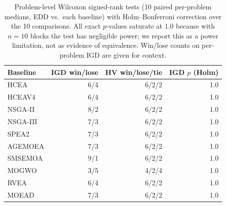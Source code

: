 \begin{table}[t]
\centering
\caption{Problem-level Wilcoxon signed-rank tests (10 paired per-problem
medians, EDD vs.\ each baseline) with Holm--Bonferroni correction over the
10 comparisons. All exact $p$-values saturate at $1.0$ because with $n=10$
blocks the test has negligible power; we report this as a power limitation,
not as evidence of equivalence. Win/lose counts on per-problem IGD are given
for context.}
\label{tab:wilcoxon}
\begin{tabular}{lrrr}
\toprule
Baseline & IGD win/lose & HV win/lose/tie & IGD $p$ (Holm) \\
\midrule
HCEA     & 6/4 & 6/2/2 & 1.0 \\
HCEAV4   & 6/4 & 6/2/2 & 1.0 \\
NSGA-II  & 8/2 & 6/2/2 & 1.0 \\
NSGA-III & 7/3 & 6/2/2 & 1.0 \\
SPEA2    & 7/3 & 6/2/2 & 1.0 \\
AGEMOEA  & 7/3 & 6/2/2 & 1.0 \\
SMSEMOA  & 9/1 & 6/2/2 & 1.0 \\
MOGWO    & 3/5 & 4/2/4 & 1.0 \\
RVEA     & 6/4 & 6/2/2 & 1.0 \\
MOEAD    & 7/3 & 6/2/2 & 1.0 \\
\bottomrule
\end{tabular}
\end{table}
